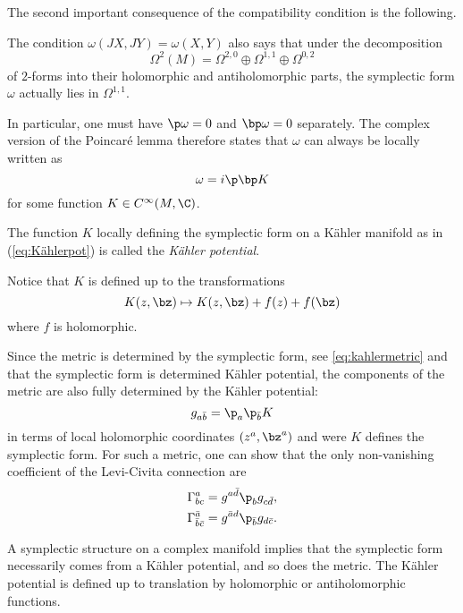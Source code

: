 \documentclass{worksheetclass}
\begin{document}
        The second important consequence of the compatibility condition is the following.
        \begin{prop}
            The condition $\omega(JX,JY)=\omega(X,Y)$ also says that under the decomposition
            \begin{equation}
                \Omega^2(M) = \Omega^{2,0}\oplus\Omega^{1,1}\oplus\Omega^{0,2}
            \end{equation}
            of $2$-forms into their holomorphic and antiholomorphic parts, the symplectic form $\omega$ actually lies in $\Omega^{1,1}$.
        \end{prop}
        In particular, one must have $\p\omega=0$ and $\bp\omega=0$ separately. The complex version of the Poincaré lemma therefore states that $\omega$ can always be locally written as
        \begin{equation}\label{eq:Kählerpot}
            \omega = i\p\bp K 
        \end{equation}
        for some function $K\in C^\infty (M,\C)$.
        \begin{defn}
            The function $K$ locally defining the symplectic form on a Kähler manifold as in (\ref{eq:Kählerpot}) is called the \emph{Kähler potential}.
        \end{defn}
        Notice that $K$ is defined up to the transformations
        \begin{equation}
            K(z,\bz)\mapsto K(z,\bz)+f(z)+f(\bz)
        \end{equation}
        where $f$ is holomorphic.
        
        
        Since the metric is determined by the symplectic form, see \eqref{eq:kahlermetric} and that the symplectic form is determined Kähler potential,   the components of the metric  are also fully determined by the Kähler potential:
        \begin{equation}
            g_{a\bar{b}}=\p_a\p_{\bar{b}}K
        \end{equation}
        in terms of local holomorphic coordinates $(z^a,\bz^a)$ and were $K$ defines the symplectic form. For such a metric, one can show that the only non-vanishing coefficient of the Levi-Civita connection are
        \begin{align}
            \Gamma^a_{bc} &= g^{a\bar{d}}\p_bg_{c\bar{d}},\\
            \Gamma^{\bar{a}}_{\bar{b}\bar{c}} &= g^{\bar{a}d}\p_{\bar{b}}g_{d\bar{c}}.
        \end{align}
        \begin{result}
            A symplectic structure on a complex manifold implies that the symplectic form necessarily comes from a Kähler potential, and so does the metric. The Kähler potential is defined up to translation by holomorphic or antiholomorphic functions.
        \end{result}
        
\end{document}
